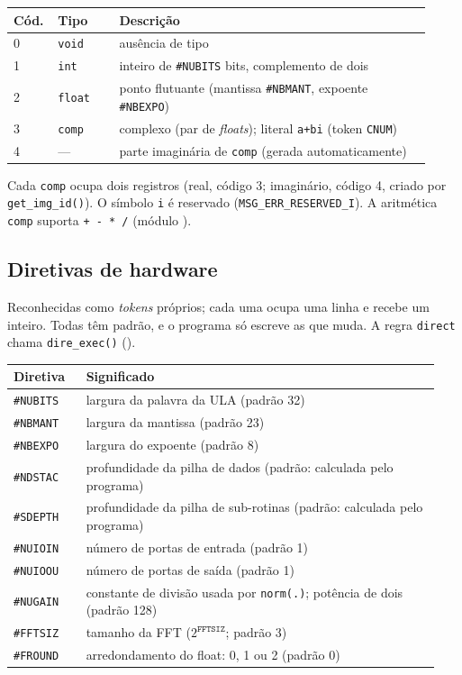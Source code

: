 \documentclass[11pt,a4paper,oneside]{article}
\newcommand{\file}[1]{\path{#1}}
\newcommand{\code}[1]{\lstinline[basicstyle=\ttfamily]|#1|}
\begin{document}
\begin{longtable}{@{}p{0.07\linewidth}p{0.14\linewidth}p{0.71\linewidth}@{}}
\toprule
\textbf{Cód.} & \textbf{Tipo} & \textbf{Descrição} \\
\midrule
\endhead
0 & \lstinline|void| & ausência de tipo \\
1 & \lstinline|int| & inteiro de \lstinline|#NUBITS| bits, complemento de dois \\
2 & \lstinline|float| & ponto flutuante (mantissa \lstinline|#NBMANT|, expoente \lstinline|#NBEXPO|) \\
3 & \lstinline|comp| & complexo (par de \emph{floats}); literal \lstinline|a+bi| (token \code{CNUM}) \\
4 & --- & parte imaginária de \lstinline|comp| (gerada automaticamente) \\
\bottomrule
\end{longtable}

Cada \lstinline|comp| ocupa dois registros (real, código 3; imaginário, código 4, criado por \lstinline|get_img_id()|). O símbolo \lstinline|i| é reservado (\lstinline|MSG_ERR_RESERVED_I|). A aritmética \lstinline|comp| suporta \lstinline|+ - * /| (módulo \file{oper.c}).

\subsection{Diretivas de hardware}

Reconhecidas como \emph{tokens} próprios; cada uma ocupa uma linha e recebe um inteiro. Todas têm padrão, e o programa só escreve as que muda. A regra \code{direct} chama \lstinline|dire_exec()| (\file{diretivas.c}).

\begin{longtable}{@{}p{0.16\linewidth}p{0.78\linewidth}@{}}
\toprule
\textbf{Diretiva} & \textbf{Significado} \\
\midrule
\endhead
\lstinline|#NUBITS| & largura da palavra da ULA (padrão 32) \\
\lstinline|#NBMANT| & largura da mantissa (padrão 23) \\
\lstinline|#NBEXPO| & largura do expoente (padrão 8) \\
\lstinline|#NDSTAC| & profundidade da pilha de dados (padrão: calculada pelo programa) \\
\lstinline|#SDEPTH| & profundidade da pilha de sub-rotinas (padrão: calculada pelo programa) \\
\lstinline|#NUIOIN| & número de portas de entrada (padrão 1) \\
\lstinline|#NUIOOU| & número de portas de saída (padrão 1) \\
\lstinline|#NUGAIN| & constante de divisão usada por \lstinline|norm(.)|; potência de dois (padrão 128) \\
\lstinline|#FFTSIZ| & tamanho da FFT ($2^{\texttt{FFTSIZ}}$; padrão 3) \\
\lstinline|#FROUND| & arredondamento do float: 0, 1 ou 2 (padrão 0) \\
\bottomrule
\end{longtable}
\end{document}
